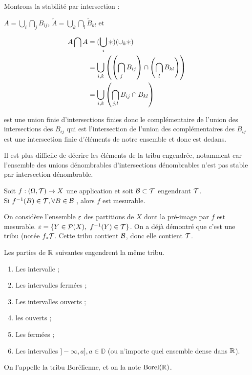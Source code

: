 \documentclass[10pt,a4paper,notitlepage ]{report}
\begin{document}
Montrons la stabilité par intersection : 

\begin{demo}
$A = \bigcup _ i \bigcap _j B_{ij} $, $\tilde A  = \bigcup_k \bigcap _ l \tilde B_{kl} $ et 

\begin{align*}
A \bigcap A &= (\bigcup _i \varhexstar ) ( \cup _ k \varhexstar ) \\
&= \bigcup_{i,k} \left( \left( \bigcap_j B_{ij} \right) \cap \left( \bigcap_l B_{kl} \right) \right) \\
&= \bigcup _{i,k} \left( \bigcap_{j,l} B_{ij} \cap B_{kl} \right) 
\end{align*}

est une union finie d'intersections finies donc le complémentaire de l'union des intersections des $B_{ij}$ qui est l'intersection de l'union des complémentaires des $B_{ij}$ est une intersection finie d'éléments de notre ensemble et donc est dedans.
\end{demo}

Il est plus difficile de décrire les éléments de la tribu engendrée, notamment car l'ensemble des unions dénombrables d'intersections dénombrables n'est pas stable par intersection dénombrable. 

\begin{propriete}
Soit $f:(\Omega,\mathcal T) \rightarrow X$ une application et soit $\mathcal B \subset \mathcal T $ engendrant $\mathcal T$. \\
Si $f^{-1} (B)\in \mathcal T , \forall B \in \mathcal B$ , alors $f$ est mesurable.
\end{propriete}

\begin{demo}
On considère l'ensemble $\varepsilon$ des partitions de $X$ dont la pré-image par $f$ est mesurable. $ \varepsilon = \lbrace Y \in \mathcal P (X), \ f^{-1}(Y) \in \mathcal T \rbrace $. 
On a déjà démontré que c'est une tribu (notée $f_* \mathcal T$. Cette tribu contient $\mathcal B$, donc elle contient $\mathcal T$. 

\end{demo}

\begin{propriete}
Les parties de $\mathbb R$ suivantes engendrent la même tribu.
	\begin{enumerate}
		\item Les intervalle ;
		\item Les intervalles fermées ;
		\item Les intervalles ouverts ;
		\item les ouverts ;
		\item Les fermées ;
		\item Les intervalles $] - \infty , a ], a \in \mathbb{D} $ (ou n'importe quel ensemble dense dans $\mathbb R$).
	\end{enumerate}
On l'appelle la tribu Borélienne, et on la note $\mathrm{Borel}(\mathbb R)$.

\end{propriete}
\end{document}
